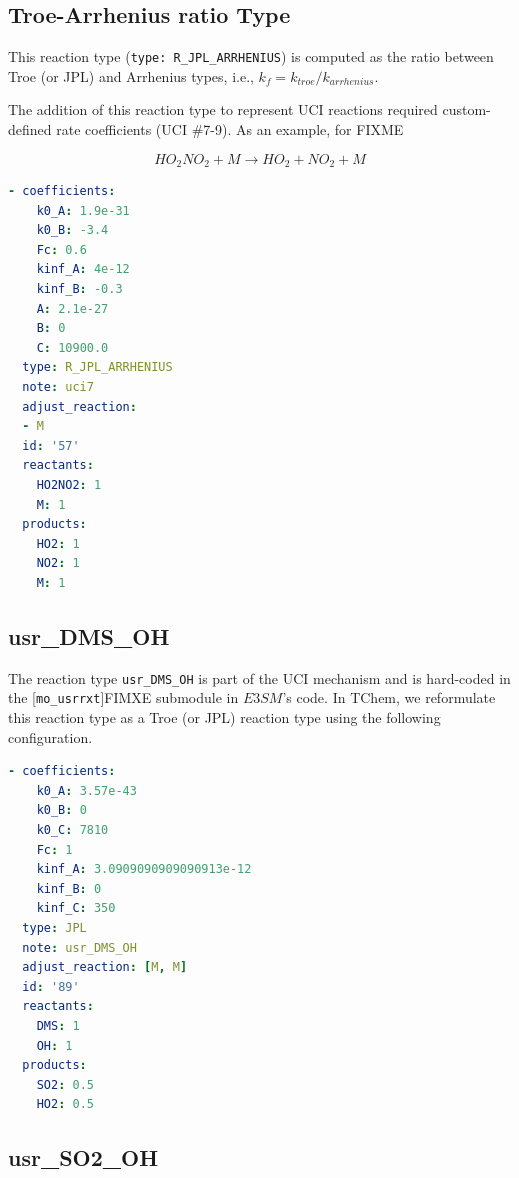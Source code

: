 \documentclass[report, 12pt]{SANDreport}
\newcommand{\eee}{E3SM}
\begin{document}
\subsection{Troe-Arrhenius ratio Type}

This reaction type (\verb|type: R_JPL_ARRHENIUS|) is computed as the ratio between Troe (or JPL) and Arrhenius types, i.e., $k_f=k_{troe}/k_{arrhenius}$.

The addition of this reaction type to represent UCI reactions required custom-defined rate coefficients (UCI \#7-9). As an example, for FIXME%

\begin{equation}
HO_2NO_2 + M \rightarrow HO_2 + NO_2 + M
\end{equation}

\begin{lstlisting}[language=yaml]
- coefficients:
    k0_A: 1.9e-31
    k0_B: -3.4
    Fc: 0.6
    kinf_A: 4e-12
    kinf_B: -0.3
    A: 2.1e-27
    B: 0
    C: 10900.0
  type: R_JPL_ARRHENIUS
  note: uci7
  adjust_reaction:
  - M
  id: '57'
  reactants:
    HO2NO2: 1
    M: 1
  products:
    HO2: 1
    NO2: 1
    M: 1
\end{lstlisting}
\subsection{usr\_DMS\_OH}

The reaction type \verb|usr_DMS_OH| is part of the UCI mechanism and is hard-coded in the [\verb|mo_usrrxt|]FIMXE
submodule in $\eee$'s code. In TChem, we reformulate this reaction type as a Troe (or JPL) reaction type using the following configuration.

\begin{lstlisting}[language=yaml]
- coefficients:
    k0_A: 3.57e-43
    k0_B: 0
    k0_C: 7810
    Fc: 1
    kinf_A: 3.0909090909090913e-12
    kinf_B: 0
    kinf_C: 350
  type: JPL
  note: usr_DMS_OH
  adjust_reaction: [M, M]
  id: '89'
  reactants:
    DMS: 1
    OH: 1
  products:
    SO2: 0.5
    HO2: 0.5
\end{lstlisting}

\subsection{usr\_SO2\_OH}
\end{document}
